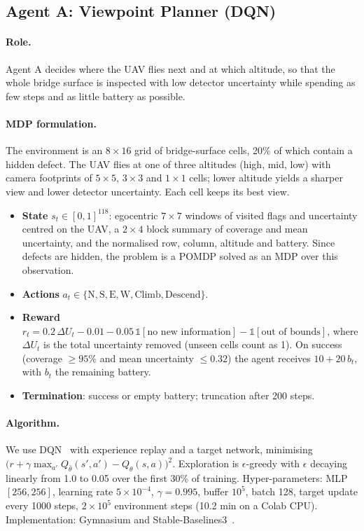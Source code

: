 \subsection{Agent A: Viewpoint Planner (DQN)}
\label{sec:agentA}

\paragraph{Role.} Agent A decides where the UAV flies next and at which altitude, so that the whole bridge surface
is inspected with low detector uncertainty while spending as few steps and as little battery as possible.

\paragraph{MDP formulation.} The environment is an $8\times16$ grid of bridge-surface cells, 20\% of which contain a
hidden defect. The UAV flies at one of three altitudes (high, mid, low) with camera footprints of $5\times5$, $3\times3$
and $1\times1$ cells; lower altitude yields a sharper view and lower detector uncertainty. Each cell keeps its best view.
\begin{itemize}
  \item \textbf{State} $s_t \in [0,1]^{118}$: egocentric $7\times7$ windows of visited flags and uncertainty centred on the UAV,
        a $2\times4$ block summary of coverage and mean uncertainty, and the normalised row, column, altitude and battery.
        Since defects are hidden, the problem is a POMDP solved as an MDP over this observation.
  \item \textbf{Actions} $a_t \in \{\text{N},\text{S},\text{E},\text{W},\text{Climb},\text{Descend}\}$.
  \item \textbf{Reward} $r_t = 0.2\,\Delta U_t - 0.01 - 0.05\,\mathbb{1}[\text{no new information}] - \mathbb{1}[\text{out of bounds}]$,
        where $\Delta U_t$ is the total uncertainty removed (unseen cells count as 1). On success
        (coverage $\ge 95\%$ and mean uncertainty $\le 0.32$) the agent receives $10 + 20\,b_t$, with $b_t$ the remaining battery.
  \item \textbf{Termination}: success or empty battery; truncation after 200 steps.
\end{itemize}

\paragraph{Algorithm.} We use DQN~\cite{mnih2015human} with experience replay and a target network,
minimising $\big(r + \gamma \max_{a'} Q_{\bar\theta}(s',a') - Q_\theta(s,a)\big)^2$. Exploration is $\epsilon$-greedy with
$\epsilon$ decaying linearly from 1.0 to 0.05 over the first 30\% of training. Hyper-parameters: MLP $[256,256]$,
learning rate $5\times10^{-4}$, $\gamma=0.995$, buffer $10^5$, batch 128, target update every 1000 steps,
$2\times10^5$ environment steps (10.2 min on a Colab CPU). Implementation: Gymnasium and Stable-Baselines3~\cite{raffin2021sb3}.

